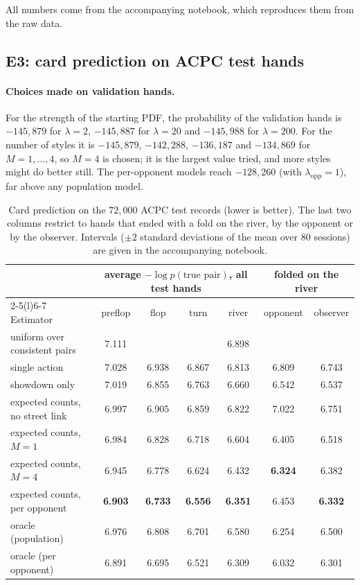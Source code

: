 \documentclass[11pt,a4paper]{article}
\newcommand{\1}{\mathbf{1}}
\begin{document}
All numbers come from the accompanying notebook, which reproduces them from the
raw data.

\subsection{E3: card prediction on ACPC test hands}

\paragraph{Choices made on validation hands.} For the strength of the starting
PDF, the probability of the validation hands is $-145{,}879$ for $\lambda=2$,
$-145{,}887$ for $\lambda=20$ and $-145{,}988$ for $\lambda=200$. For the number of
styles it is $-145{,}879$, $-142{,}288$, $-136{,}187$ and $-134{,}869$ for
$M=1,\dots,4$, so $M=4$ is chosen; it is the largest value tried, and more styles
might do better still. The per-opponent models reach $-128{,}260$ (with
$\lambda_{\text{opp}}=1$), far above any population model.

\begin{table}[t]
\centering\small
\begin{tabular}{@{}lcccccc@{}}
\toprule
& \multicolumn{4}{c}{average $-\log p(\text{true pair})$, all test hands} & \multicolumn{2}{c}{folded on the river}\\
\cmidrule(r){2-5}\cmidrule(l){6-7}
Estimator & preflop & flop & turn & river & opponent & observer\\
\midrule
uniform over consistent pairs & 7.111 & & & 6.898 & & \\
single action~\cite{terry2005} & 7.028 & 6.938 & 6.867 & 6.813 & 6.809 & 6.743\\
showdown only & 7.019 & 6.855 & 6.763 & 6.660 & 6.542 & 6.537\\
expected counts, no street link & 6.997 & 6.905 & 6.859 & 6.822 & 7.022 & 6.751\\
expected counts, $M=1$ & 6.984 & 6.828 & 6.718 & 6.604 & 6.405 & 6.518\\
expected counts, $M=4$ & 6.945 & 6.778 & 6.624 & 6.432 & \textbf{6.324} & 6.382\\
expected counts, per opponent & \textbf{6.903} & \textbf{6.733} & \textbf{6.556} & \textbf{6.351} & 6.453 & \textbf{6.332}\\
\midrule
oracle (population) & 6.976 & 6.808 & 6.701 & 6.580 & 6.254 & 6.500\\
oracle (per opponent) & 6.891 & 6.695 & 6.521 & 6.309 & 6.032 & 6.301\\
\bottomrule
\end{tabular}
\caption{Card prediction on the $72{,}000$ ACPC test records (lower is better).
The last two columns restrict to hands that ended with a fold on the river, by
the opponent or by the observer. Intervals ($\pm2$ standard deviations of the
mean over 80 sessions) are given in the accompanying notebook.}
\label{tab:cards}
\end{table}
\end{document}
